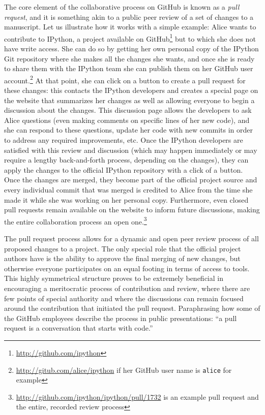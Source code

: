 \documentclass[11pt,oneside,english]{article}
\begin{document}
The core element of the collaborative process on GitHub is known as a
\emph{pull request}, and it is something akin to a public peer review of a set
of changes to a manuscript.  Let us illustrate how it works with a simple
example: Alice wants to contribute to IPython, a project available on
GitHub\footnote{\url{http://github.com/ipython}} but to which she does not have
write access. She can do so by getting her own personal copy of the IPython Git
repository where she makes all the changes she wants, and once she is ready to
share them with the IPython team she can publish them on her GitHub user
account.\footnote{\url{http://gitub.com/alice/ipython} if her GitHub user name
is \texttt{alice} for example}  At that point, she can click on a button to
create a pull request for these changes: this contacts the IPython developers
and creates a special page on the website that summarizes her changes as well
as allowing everyone to begin a discussion about the changes.  This discussion
page allows the developers to ask Alice questions (even making comments on
specific lines of her new code), and she can respond to these questions, update
her code with new commits in order to address any required improvements, etc.
Once the IPython developers are satisfied with this review and discussion
(which may happen immediately or may require a lengthy back-and-forth process,
depending on the changes), they can apply the changes to the official IPython
repository with a click of a button.  Once the changes are merged, they become
part of the official project source and every individual commit that was merged
is credited to Alice from the time she made it while she was working on her
personal copy.  Furthermore, even closed pull requests remain available on the
website to inform future discussions, making the entire collaboration process
an open one.\footnote{\url{http://github.com/ipython/ipython/pull/1732} is an
example pull request and the entire, recorded review process}

The pull request process allows for a dynamic and open peer review process of
all proposed changes to a project.  The only special role that the official
project authors have is the ability to approve the final merging of new
changes, but otherwise everyone participates on an equal footing in terms of
access to tools.  This highly symmetrical structure proves to be extremely
beneficial in encouraging a meritocratic process of contribution and
review, where there are few points of special authority and where the
discussions can remain focused around the contribution that initiated the pull
request.  Paraphrasing how some of the GitHub employees describe the process in
public presentations: ``a pull request is a conversation that starts with
code.''
\end{document}
